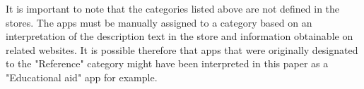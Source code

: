 It is important to note that the categories listed above are not defined in the stores. The apps must be manually assigned to a category based on an interpretation of the description text in the store and information obtainable on related websites. It is possible therefore that apps that were originally designated to the "Reference" category might have been interpreted in this paper as a "Educational aid" app for example. 